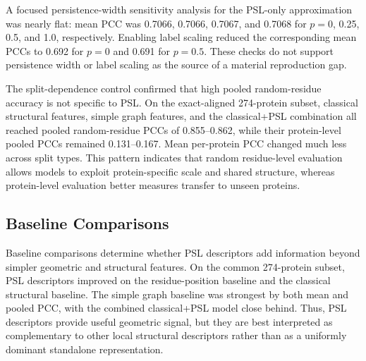 \documentclass[11pt]{article}
\begin{document}
A focused persistence-width sensitivity analysis for the PSL-only approximation was nearly flat: mean PCC was 0.7066, 0.7066, 0.7067, and 0.7068 for $p=0$, 0.25, 0.5, and 1.0, respectively. Enabling label scaling reduced the corresponding mean PCCs to 0.692 for $p=0$ and 0.691 for $p=0.5$. These checks do not support persistence width or label scaling as the source of a material reproduction gap.

The split-dependence control confirmed that high pooled random-residue accuracy is not specific to PSL. On the exact-aligned 274-protein subset, classical structural features, simple graph features, and the classical+PSL combination all reached pooled random-residue PCCs of 0.855--0.862, while their protein-level pooled PCCs remained 0.131--0.167. Mean per-protein PCC changed much less across split types. This pattern indicates that random residue-level evaluation allows models to exploit protein-specific scale and shared structure, whereas protein-level evaluation better measures transfer to unseen proteins.

\begin{table}[htbp]
\centering
\caption{Split-dependence control on raw B-factors using a common 200-tree Random Forest on the exact-aligned 274-protein subset.}
\label{tab:split_dependence}
\end{table}

\subsection{Baseline Comparisons}
Baseline comparisons determine whether PSL descriptors add information beyond simpler geometric and structural features. On the common 274-protein subset, PSL descriptors improved on the residue-position baseline and the classical structural baseline. The simple graph baseline was strongest by both mean and pooled PCC, with the combined classical+PSL model close behind. Thus, PSL descriptors provide useful geometric signal, but they are best interpreted as complementary to other local structural descriptors rather than as a uniformly dominant standalone representation.
\end{document}
